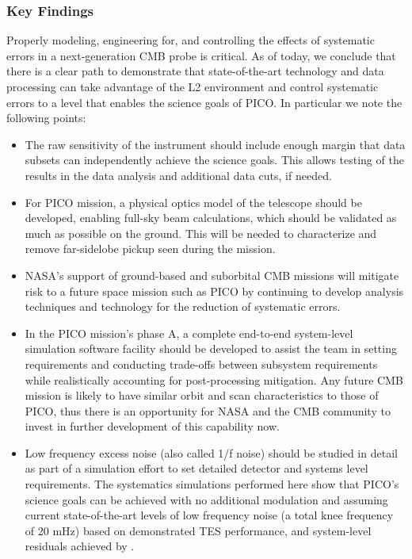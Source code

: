 \documentclass[PICOReport.tex]{subfiles}
\begin{document}
\subsubsection{Key Findings}
Properly modeling, engineering for, and controlling the effects of systematic errors in a
next-generation CMB probe is critical.  As of today, we conclude that there is a clear path to demonstrate that state-of-the-art technology and data processing can take advantage of the L2 environment and control systematic errors to a level that enables the science goals of PICO. In particular we note the following points:
\begin{itemize}
\item The raw sensitivity of the instrument should include enough margin
that data subsets can independently achieve the science goals.
This allows testing of the results in the data analysis and additional
data cuts, if needed.
\item For PICO mission, a physical optics model of the telescope should be developed, enabling full-sky beam calculations, which should be validated as much as possible on the ground.  This will be needed to characterize and remove far-sidelobe pickup seen during the mission. 
\item NASA's support of ground-based and suborbital CMB missions will mitigate risk to a future space mission such as PICO by continuing to develop analysis techniques and technology for the reduction of systematic errors.

\item In the PICO mission's phase A, a complete end-to-end system-level
simulation software facility should be developed to assist the team in setting 
requirements and conducting trade-offs between subsystem requirements while
realistically accounting for post-processing mitigation.  Any future
CMB mission is likely to have similar orbit  
and scan characteristics to those of PICO, thus there is an opportunity for NASA and
the CMB community to invest in further development of this capability now.
\item Low frequency excess noise (also called 1/f noise) should be studied in detail as part of a simulation effort to set detailed detector and systems level requirements.  The systematics simulations performed here show that PICO's science goals can be achieved with no additional modulation and assuming current state-of-the-art levels of low frequency noise (a total knee frequency of 20 mHz) based on demonstrated TES performance, and system-level residuals achieved by \planck.
\end{itemize}
\end{document}
